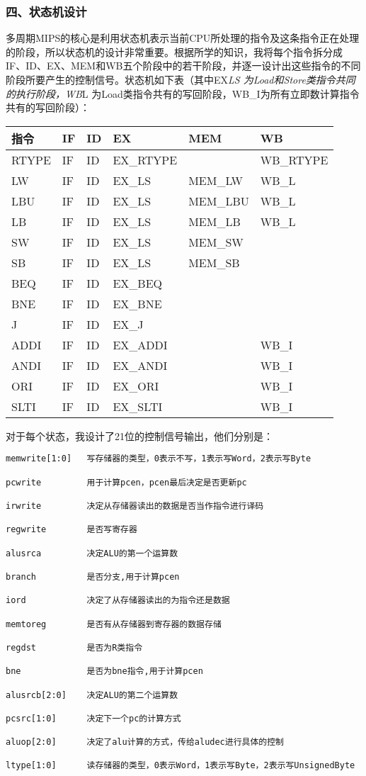 \documentclass[]{article}
\begin{document}
\subsubsection{四、状态机设计}\label{header-n1858}

多周期MIPS的核心是利用状态机表示当前CPU所处理的指令及这条指令正在处理的阶段，所以状态机的设计非常重要。根据所学的知识，我将每个指令拆分成IF、ID、EX、MEM和WB五个阶段中的若干阶段，并逐一设计出这些指令的不同阶段所要产生的控制信号。状态机如下表（其中EX\emph{LS
为Load和Store类指令共同的执行阶段，WB}L
为Load类指令共有的写回阶段，WB\_I为所有立即数计算指令共有的写回阶段）：

\begin{longtable}[]{@{}llllll@{}}
\toprule
指令 & IF & ID & EX & MEM & WB\tabularnewline
\midrule
\endhead
RTYPE & IF & ID & EX\_RTYPE & & WB\_RTYPE\tabularnewline
LW & IF & ID & EX\_LS & MEM\_LW & WB\_L\tabularnewline
LBU & IF & ID & EX\_LS & MEM\_LBU & WB\_L\tabularnewline
LB & IF & ID & EX\_LS & MEM\_LB & WB\_L\tabularnewline
SW & IF & ID & EX\_LS & MEM\_SW &\tabularnewline
SB & IF & ID & EX\_LS & MEM\_SB &\tabularnewline
BEQ & IF & ID & EX\_BEQ & &\tabularnewline
BNE & IF & ID & EX\_BNE & &\tabularnewline
J & IF & ID & EX\_J & &\tabularnewline
ADDI & IF & ID & EX\_ADDI & & WB\_I\tabularnewline
ANDI & IF & ID & EX\_ANDI & & WB\_I\tabularnewline
ORI & IF & ID & EX\_ORI & & WB\_I\tabularnewline
SLTI & IF & ID & EX\_SLTI & & WB\_I\tabularnewline
\bottomrule
\end{longtable}

对于每个状态，我设计了21位的控制信号输出，他们分别是：

\begin{verbatim}
memwrite[1:0]	写存储器的类型，0表示不写，1表示写Word，2表示写Byte

pcwrite			用于计算pcen，pcen最后决定是否更新pc

irwrite			决定从存储器读出的数据是否当作指令进行译码

regwrite		是否写寄存器

alusrca			决定ALU的第一个运算数

branch			是否分支,用于计算pcen

iord			决定了从存储器读出的为指令还是数据

memtoreg		是否有从存储器到寄存器的数据存储

regdst			是否为R类指令

bne				是否为bne指令,用于计算pcen

alusrcb[2:0]	决定ALU的第二个运算数

pcsrc[1:0]		决定下一个pc的计算方式

aluop[2:0]		决定了alu计算的方式，传给aludec进行具体的控制

ltype[1:0]		读存储器的类型，0表示Word，1表示写Byte，2表示写UnsignedByte
\end{verbatim}
\end{document}
